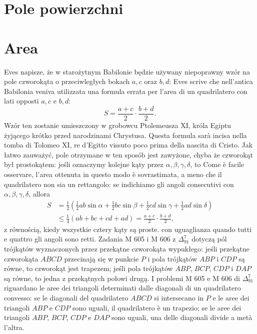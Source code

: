 
%

\section{Pole powierzchni} %
\section{Area} %

Eves \cite[s. 4]{eves1_1972} napisze, że w starożytnym Babilonie będzie używany niepoprawny wzór na pole czworokąta o przeciwległych bokach $a, c$ oraz $b, d$: %
Eves \cite[p. 4]{eves1_1972} scrive che nell'antica Babilonia veniva utilizzata una formula errata per l'area di un quadrilatero con lati opposti $a, c$ e $b, d$: %
\begin{equation}
	S = \frac{a + c}{2} \cdot \frac{b + d}{2}.
\end{equation}
Wzór ten zostanie umieszczony w grobowcu Ptolemeusza XI, króla Egiptu żyjącego krótko przed narodzinami Chrystusa. %
Questa formula sarà incisa nella tomba di Tolomeo XI, re d'Egitto vissuto poco prima della nascita di Cristo. %
Jak łatwo zauważyć, pole otrzymane w ten sposób jest zawyżone, chyba że czworokąt był prostokątem: jeśli oznaczymy kolejne kąty przez $\alpha, \beta, \gamma, \delta$, to %
Come è facile osservare, l'area ottenuta in questo modo è sovrastimata, a meno che il quadrilatero non sia un rettangolo: se indichiamo gli angoli consecutivi con $\alpha, \beta, \gamma, \delta$, allora %
\begin{align}
	S & = \frac 1 2 \left(\frac 1 2 ab \sin \alpha + \frac 1 2 bc \sin \beta + \frac 1 2 cd \sin \gamma + \frac 1 2 ad \sin \delta\right) \\
	& \le \frac 1 4 (ab + bc + cd + ad) = \frac{a + c}{2} \cdot \frac{b + d}{2},
\end{align}
z równością, kiedy wszystkie cztery kąty są proste. %
con uguaglianza quando tutti e quattro gli angoli sono retti. %
Zadania M 605 i M 606 z $\Delta_{91}^{7}$ dotyczą pól trójkątów wyznaczonych przez przekątne czworokąta wypukłego: jeśli przekątne czworokąta $ABCD$ przecinają się w punkcie $P$ i pola trójkątów $ABP$ i $CDP$ są równe, to czworokąt jest trapezem; jeśli pola trójkątów $ABP$, $BCP$, $CDP$ i $DAP$ są równe, to jedna z przekątnych połowi drugą. %
I problemi M 605 e M 606 di $\Delta_{91}^{7}$ riguardano le aree dei triangoli determinati dalle diagonali di un quadrilatero convesso: se le diagonali del quadrilatero $ABCD$ si intersecano in $P$ e le aree dei triangoli $ABP$ e $CDP$ sono uguali, il quadrilatero è un trapezio; se le aree dei triangoli $ABP$, $BCP$, $CDP$ e $DAP$ sono uguali, una delle diagonali divide a metà l'altra. %


%